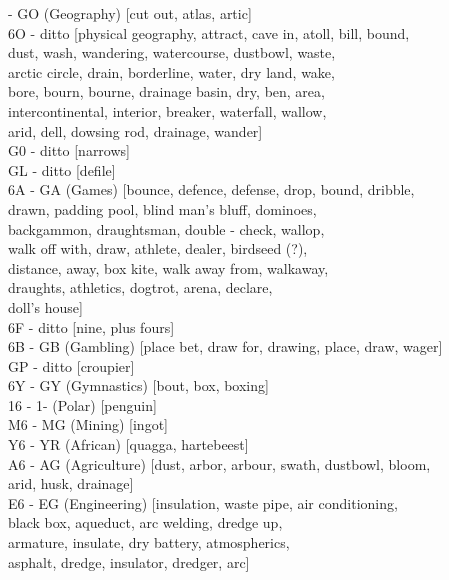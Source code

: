  - GO (Geography)    [cut out, atlas, artic] \\
6O - ditto     [physical geography, attract, cave in, atoll, bill, bound, \\
                dust, wash, wandering, watercourse, dustbowl, waste, \\
                arctic circle, drain, borderline, water, dry land, wake, \\
                bore, bourn, bourne, drainage basin, dry, ben, area, \\
                intercontinental, interior, breaker, waterfall, wallow, \\
                arid, dell, dowsing rod, drainage, wander] \\
G0 - ditto      [narrows] \\
GL - ditto      [defile] \\
6A - GA (Games) [bounce, defence, defense, drop, bound, dribble, \\
                 drawn, padding pool, blind man's bluff, dominoes, \\
                 backgammon, draughtsman, double - check, wallop, \\
                 walk off with, draw, athlete, dealer, birdseed (?), \\
                 distance, away, box kite, walk away from, walkaway, \\
                 draughts, athletics, dogtrot, arena, declare, \\
                 doll's house] \\
6F - ditto           [nine, plus fours] \\
6B - GB (Gambling)   [place bet, draw for, drawing, place, draw, wager] \\
GP - ditto               [croupier] \\
6Y - GY (Gymnastics)     [bout, box, boxing] \\
16 - 1- (Polar)          [penguin] \\
M6 - MG (Mining)         [ingot] \\
Y6 - YR (African)        [quagga, hartebeest] \\
A6 - AG (Agriculture)    [dust, arbor, arbour, swath, dustbowl, bloom, \\
                          arid, husk, drainage] \\
E6 - EG (Engineering)    [insulation, waste pipe, air conditioning, \\
                          black box, aqueduct, arc welding, dredge up, \\
                          armature, insulate, dry battery, atmospherics, \\
                          asphalt, dredge, insulator, dredger, arc] \\


